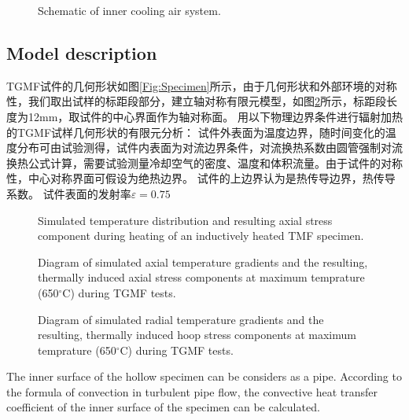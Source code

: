 \documentclass{article}
\begin{document}
\begin{figure}[!htp]
\caption{Schematic of inner cooling air system.}
\label{Fig:inner_cooling}
\end{figure}

\subsection{Model description}
TGMF试件的几何形状如图\ref{Fig:Specimen}所示，由于几何形状和外部环境的对称性，我们取出试样的标距段部分，建立轴对称有限元模型，如图\ref{Fig:FEM}所示，标距段长度为12mm，取试件的中心界面作为轴对称面。
用以下物理边界条件进行辐射加热的TGMF试样几何形状的有限元分析：
试件外表面为温度边界，随时间变化的温度分布可由试验测得，试件内表面为对流边界条件，对流换热系数由圆管强制对流换热公式计算，需要试验测量冷却空气的密度、温度和体积流量。由于试件的对称性，中心对称界面可假设为绝热边界。
试件的上边界认为是热传导边界，热传导系数。
试件表面的发射率$\varepsilon=0.75$

\begin{figure}[!htp]
\caption{Simulated temperature distribution and resulting axial stress component during heating of an inductively heated TMF specimen.}
\label{Fig:FEM}
\end{figure}

\begin{figure}[!htp]
\caption{Diagram of simulated axial temperature gradients and the resulting, thermally induced axial stress components at maximum temprature (650$^{\circ}$C) during TGMF tests.}
\label{Fig:plot_temperature_along_gauge_length}
\end{figure}

\begin{figure}[!htp]
\caption{Diagram of simulated radial temperature gradients and the resulting, thermally induced hoop stress components at maximum temprature (650$^{\circ}$C) during TGMF tests.}
\label{Fig:plot_temperature_along_radial_direction}
\end{figure}




The inner surface of the hollow specimen can be considers as a pipe.
According to the formula of convection in turbulent pipe flow, the convective heat transfer coefficient of the inner surface of the specimen can be calculated.
\end{document}
